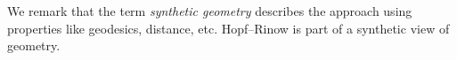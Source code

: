 



















We remark that the term \emph{synthetic geometry} describes the approach using properties like geodesics, distance, etc. Hopf--Rinow is part of a synthetic view of geometry.

